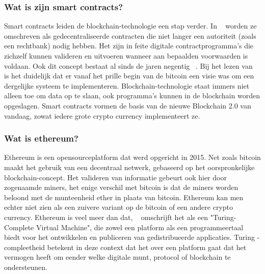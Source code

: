 \subsubsection*{Wat is zijn smart contracts?}
Smart contracts leiden de blockchain-technologie een stap verder. In ~\textcite{Swan2015} worden ze omschreven als gedecentraliseerde contracten die niet langer een autoriteit (zoals een rechtbank) nodig hebben. Het zijn in feite digitale contractprogramma's die zichzelf kunnen valideren en uitvoeren wanneer aan bepaalden voorwaarden is voldaan. Ook dit concept bestaat al sinds de jaren negentig ~\autocite{Szabo1996}. Bij het lezen van ~\textcite{Nakamoto2008} is het duidelijk dat er vanaf het prille begin van de bitcoin een visie was om een dergelijke systeem te implementeren. Blockchain-technologie staat immers niet alleen toe om data op te slaan, ook programma's kunnen in de blockchain worden opgeslagen. Smart contracts vormen de basis van de nieuwe Blockchain 2.0 van vandaag, zowat iedere grote crypto currency implementeert ze.

\subsubsection*{Wat is ethereum?}
Ethereum is een opensourceplatform dat werd opgericht in 2015. Net zoals bitcoin maakt het gebruik van een decentraal netwerk, gebaseerd op het oorspronkelijke blockchain-concept. Het valideren van informatie gebeurt ook hier door zogenaamde miners, het enige verschil met bitcoin is dat de miners worden beloond met de munteenheid ether in plaats van bitcoin. Ethereum kan men echter niet zien als een zuivere variant op de bitcoin of een andere crypto currency. Ethereum is veel meer dan dat, ~\textcite{Swan2015} omschrijft het als een "Turing-Complete Virtual Machine", die zowel een platform als een programmeertaal biedt voor het ontwikkelen en publiceren van gedistribueerde applicaties. Turing -compleetheid betekent in deze context dat het over een platform gaat dat het vermogen heeft om eender welke digitale munt, protocol of blockchain te ondersteunen.

